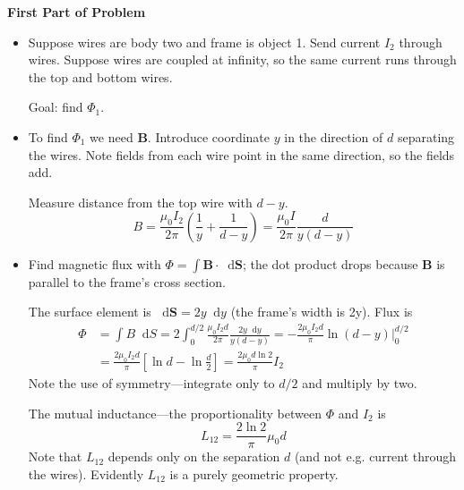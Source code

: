 \documentclass[11pt, a4paper]{article}
\newcommand{\diff}{\mathop{}\!\mathrm{d}} %
\renewcommand{\vec}[1]{\bm{#1}} %
\newcommand{\B}{\vec{B}}  %
\newcommand{\mm}{\mu_{0}}  %
\newcommand{\m}{\vec{m}}  %
\begin{document}
\textbf{First Part of Problem}
\begin{itemize}
	\item Suppose wires are body two and frame is object 1. Send current $ I_{2} $ through wires. Suppose wires are coupled at infinity, so the same current runs through the top and bottom wires.
	
	Goal: find $ \Phi_{1} $. 
	
	\item To find $ \Phi_{1} $ we need $ \B $. Introduce coordinate $ y $ in the direction of $ d $ separating the wires. Note fields from each wire point in the same direction, so the fields add.
	
	Measure distance from the top wire with $ d - y $. 
	\begin{equation*}
		B = \frac{\mm I_{2}}{2\pi} \left(\frac{1}{y} + \frac{1}{d-y}\right) =  \frac{\mm I}{2\pi}  \frac{d}{y(d-y)}
	\end{equation*}
	
	\item Find magnetic flux with $ \Phi = \int \B \cdot \diff \vec{S} $; the dot product drops because $ \B $ is parallel to the frame's cross section.
	
	The surface element is $ \diff \vec{S} = 2y\diff y $ (the frame's width is 2y). Flux is
	\begin{align*}
		\Phi &= \int B \diff S = 2\int_{0}^{d/2} \frac{\mm I_{2}d}{2\pi}  \frac{2y\diff y}{y(d-y)} = -\frac{2\mm I_{2}d}{\pi} \ln(d-y)\big |_{0}^{d/2}\\
		& =  \frac{2\mm I_{2}d}{\pi} \left[\ln d - \ln\frac{d}{2}\right] =  \frac{2\mm d \ln 2}{\pi}  I_{2}
	\end{align*}
	Note the use of symmetry---integrate only to $ d/2 $ and multiply by two.
	
	The mutual inductance---the proportionality between $ \Phi $ and $ I_{2} $ is 
	\begin{equation*}
		L_{12} = \frac{2\ln 2}{\pi} \mm d
	\end{equation*}
	Note that $ L_{12} $ depends only on the separation $ d $ (and not e.g. current through the wires). Evidently $ L_{12} $ is a purely geometric property. 
\end{itemize}
\end{document}
